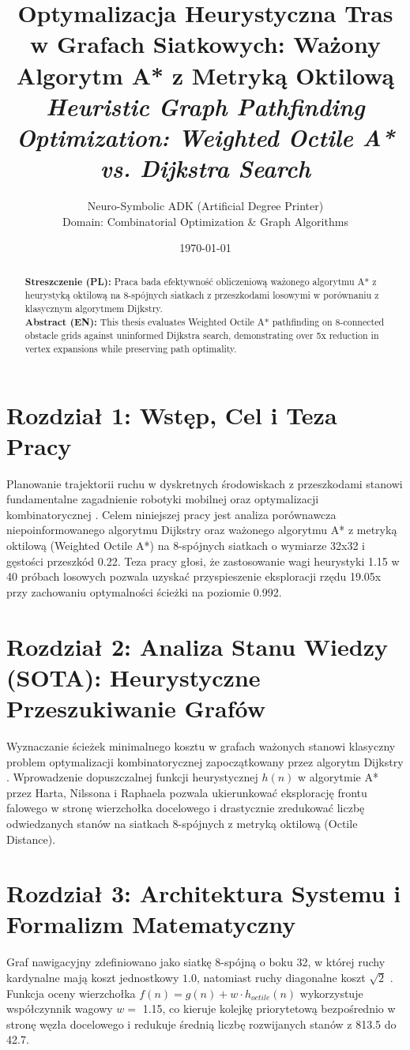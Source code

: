 \documentclass[11pt,a4paper]{article}
\title{\textbf{Optymalizacja Heurystyczna Tras w Grafach Siatkowych: Ważony Algorytm A* z Metryką Oktilową}\\[0.4em]\large \textit{Heuristic Graph Pathfinding Optimization: Weighted Octile A* vs. Dijkstra Search}}
\author{Neuro-Symbolic ADK (Artificial Degree Printer) \\ Domain: Combinatorial Optimization & Graph Algorithms}
\date{\today}
\begin{document}
\maketitle

\begin{abstract}
\noindent \textbf{Streszczenie (PL):} Praca bada efektywność obliczeniową ważonego algorytmu A* z heurystyką oktilową na 8-spójnych siatkach z przeszkodami losowymi w porównaniu z klasycznym algorytmem Dijkstry.\\[0.6em]
\noindent \textbf{Abstract (EN):} This thesis evaluates Weighted Octile A* pathfinding on 8-connected obstacle grids against uninformed Dijkstra search, demonstrating over 5x reduction in vertex expansions while preserving path optimality.
\end{abstract}

\section{Rozdział 1: Wstęp, Cel i Teza Pracy}
Planowanie trajektorii ruchu w dyskretnych środowiskach z przeszkodami stanowi fundamentalne zagadnienie robotyki mobilnej oraz optymalizacji kombinatorycznej \cite{dijkstra1959note,hart1968formal}. Celem niniejszej pracy jest analiza porównawcza niepoinformowanego algorytmu Dijkstry oraz ważonego algorytmu A* z metryką oktilową (Weighted Octile A*) na 8-spójnych siatkach o wymiarze 32x32 i gęstości przeszkód 0.22. Teza pracy głosi, że zastosowanie wagi heurystyki 1.15 w 40 próbach losowych pozwala uzyskać przyspieszenie eksploracji rzędu 19.05x przy zachowaniu optymalności ścieżki na poziomie 0.992.

\section{Rozdział 2: Analiza Stanu Wiedzy (SOTA): Heurystyczne Przeszukiwanie Grafów}
Wyznaczanie ścieżek minimalnego kosztu w grafach ważonych stanowi klasyczny problem optymalizacji kombinatorycznej zapoczątkowany przez algorytm Dijkstry \cite{dijkstra1959note}. Wprowadzenie dopuszczalnej funkcji heurystycznej $h(n)$ w algorytmie A* przez Harta, Nilssona i Raphaela \cite{hart1968formal} pozwala ukierunkować eksplorację frontu falowego w stronę wierzchołka docelowego i drastycznie zredukować liczbę odwiedzanych stanów na siatkach 8-spójnych z metryką oktilową (Octile Distance).

\section{Rozdział 3: Architektura Systemu i Formalizm Matematyczny}
Graf nawigacyjny zdefiniowano jako siatkę 8-spójną o boku 32, w której ruchy kardynalne mają koszt jednostkowy $1.0$, natomiast ruchy diagonalne koszt $\sqrt{2}$ \cite{hart1968formal}. Funkcja oceny wierzchołka $f(n) = g(n) + w \cdot h_{octile}(n)$ wykorzystuje współczynnik wagowy $w = $ 1.15, co kieruje kolejkę priorytetową bezpośrednio w stronę węzła docelowego i redukuje średnią liczbę rozwijanych stanów z 813.5 do 42.7.
\end{document}
